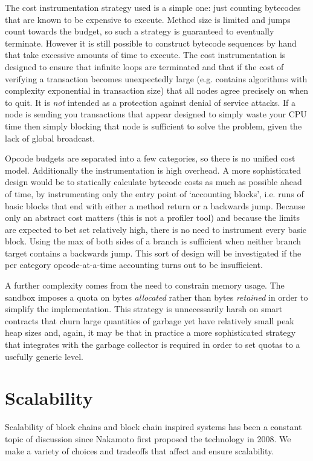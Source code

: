 \documentclass{article}
\begin{document}
The cost instrumentation strategy used is a simple one: just counting bytecodes that are known to be expensive to
execute. Method size is limited and jumps count towards the budget, so such a strategy is guaranteed to eventually
terminate. However it is still possible to construct bytecode sequences by hand that take excessive amounts of time
to execute. The cost instrumentation is designed to ensure that infinite loops are terminated and that if the cost
of verifying a transaction becomes unexpectedly large (e.g. contains algorithms with complexity exponential in
transaction size) that all nodes agree precisely on when to quit. It is \emph{not} intended as a protection against
denial of service attacks. If a node is sending you transactions that appear designed to simply waste your CPU time
then simply blocking that node is sufficient to solve the problem, given the lack of global broadcast.

Opcode budgets are separated into a few categories, so there is no unified cost model. Additionally the instrumentation is
high overhead. A more sophisticated design would be to statically calculate bytecode costs as much as possible
ahead of time, by instrumenting only the entry point of `accounting blocks', i.e. runs of basic blocks that end
with either a method return or a backwards jump. Because only an abstract cost matters (this is not a profiler
tool) and because the limits are expected to bet set relatively high, there is no need to instrument every basic
block. Using the max of both sides of a branch is sufficient when neither branch target contains a backwards jump.
This sort of design will be investigated if the per category opcode-at-a-time accounting turns out to be
insufficient.

A further complexity comes from the need to constrain memory usage. The sandbox imposes a quota on bytes
\emph{allocated} rather than bytes \emph{retained} in order to simplify the implementation. This strategy is
unnecessarily harsh on smart contracts that churn large quantities of garbage yet have relatively small peak heap
sizes and, again, it may be that in practice a more sophisticated strategy that integrates with the garbage
collector is required in order to set quotas to a usefully generic level.

\section{Scalability}

Scalability of block chains and block chain inspired systems has been a constant topic of discussion since Nakamoto
first proposed the technology in 2008. We make a variety of choices and tradeoffs that affect and ensure
scalability.
\end{document}
